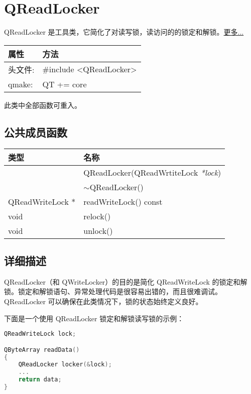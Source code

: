 \chapter{QReadLocker}

QReadLocker 是工具类，它简化了对读写锁，读访问的的锁定和解锁。\href{https://gitee.com/wcc210/QtDocumentCN/blob/master/Src/R/QReadLocker/QReadLocker.md#%E8%AF%A6%E7%BB%86%E6%8F%8F%E8%BF%B0}{更多...}

\begin{tabular}{|l|l|}
\hline
属性 &	方法\\
\hline
头文件:& 	\#include <QReadLocker>\\
\hline
qmake:& 	QT += core\\
\hline
\end{tabular}

\begin{notice}
此类中全部函数可重入。
\end{notice}

\section{公共成员函数}

\begin{tabular}{|l|m{23em}|}
\hline
类型 &	名称\\
\hline
 &	QReadLocker(QReadWrtiteLock \emph{*lock}) \\
\hline
 &	$\sim$QReadLocker() \\ 
\hline
QReadWriteLock * &	readWriteLock() const \\ 
\hline
void &	relock() \\ 
\hline
void &	unlock() \\
\hline
\end{tabular}

\section{详细描述}

QReadLocker（和 QWriteLocker）的目的是简化 QReadWriteLock 的锁定和解锁。锁定和解锁语句、异常处理代码是很容易出错的，而且很难调试。QReadLocker 可以确保在此类情况下，锁的状态始终定义良好。

下面是一个使用 QReadLocker 锁定和解锁读写锁的示例：

\begin{lstlisting}[language=C++]
QReadWriteLock lock;

QByteArray readData()
{
    QReadLocker locker(&lock);
    ...
    return data;
}
\end{lstlisting}

